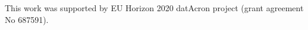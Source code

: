 \documentclass[sigconf,edbt]{acmart-edbt-workshops}
\begin{document}

\maketitle


\begin{acks}

	This work was supported by EU Horizon 2020 datAcron project (grant agreement No 687591).
	
\end{acks}


 
\end{document}
